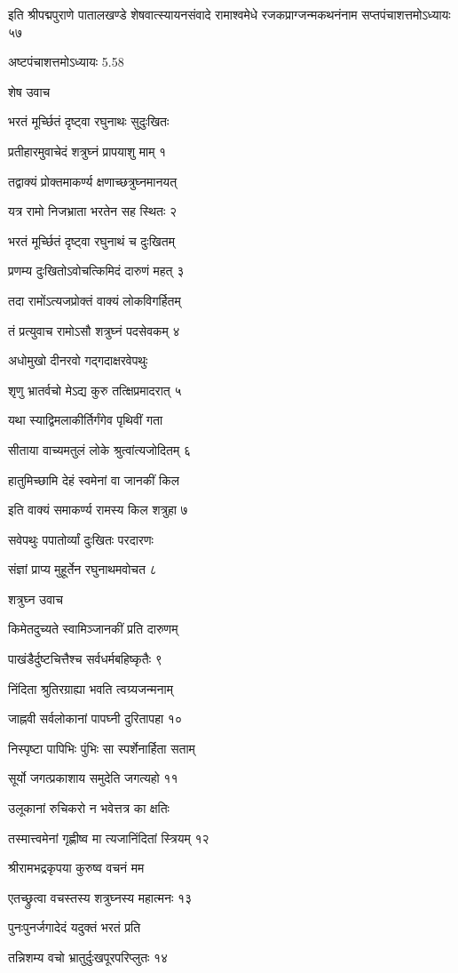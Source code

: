 इति श्रीपद्मपुराणे पातालखण्डे शेषवात्स्यायनसंवादे रामाश्वमेधे रजकप्राग्जन्मकथनंनाम
सप्तपंचाशत्तमोऽध्यायः ५७

अष्टपंचाशत्तमोऽध्यायः 5.58

शेष उवाच

भरतं मूर्च्छितं दृष्ट्वा रघुनाथः सुदुःखितः

प्रतीहारमुवाचेदं शत्रुघ्नं प्रापयाशु माम् १

तद्वाक्यं प्रोक्तमाकर्ण्य क्षणाच्छत्रुघ्नमानयत्

यत्र रामो निजभ्राता भरतेन सह स्थितः २

भरतं मूर्च्छितं दृष्ट्वा रघुनाथं च दुःखितम्

प्रणम्य दुःखितोऽवोचत्किमिदं दारुणं महत् ३

तदा रामोंऽत्यजप्रोक्तं वाक्यं लोकविगर्हितम्

तं प्रत्युवाच रामोऽसौ शत्रुघ्नं पदसेवकम् ४

अधोमुखो दीनरवो गद्गदाक्षरवेपथुः

शृणु भ्रातर्वचो मेऽद्य कुरु तत्क्षिप्रमादरात् ५

यथा स्याद्विमलाकीर्तिर्गंगेव पृथिवीं गता

सीताया वाच्यमतुलं लोके श्रुत्वांत्यजोदितम् ६

हातुमिच्छामि देहं स्वमेनां वा जानकीं किल

इति वाक्यं समाकर्ण्य रामस्य किल शत्रुहा ७

सवेपथुः पपातोर्व्यां दुःखितः परदारणः

संज्ञां प्राप्य मुहूर्तेन रघुनाथमवोचत ८

शत्रुघ्न उवाच

किमेतदुच्यते स्वामिञ्जानकीं प्रति दारुणम्

पाखंडैर्दुष्टचित्तैश्च सर्वधर्मबहिष्कृतैः ९

निंदिता श्रुतिरग्राह्या भवति त्वग्र्यजन्मनाम्

जाह्नवी सर्वलोकानां पापघ्नी दुरितापहा १०

निस्पृष्टा पापिभिः पुंभिः सा स्पर्शेनार्हिता सताम्

सूर्यो जगत्प्रकाशाय समुदेति जगत्यहो ११

उलूकानां रुचिकरो न भवेत्तत्र का क्षतिः

तस्मात्त्वमेनां गृह्णीष्व मा त्यजानिंदितां स्त्रियम् १२

श्रीरामभद्रकृपया कुरुष्व वचनं मम

एतच्छ्रुत्वा वचस्तस्य शत्रुघ्नस्य महात्मनः १३

पुनःपुनर्जगादेदं यदुक्तं भरतं प्रति

तन्निशम्य वचो भ्रातुर्दुःखपूरपरिप्लुतः १४

